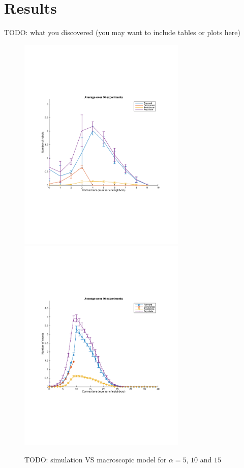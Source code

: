 \documentclass[a4paper, 10pt, conference]{ieeeconf}
\begin{document}
\section{Results}
  TODO: what you discovered (you may want to include tables or plots here)\\

  \begin{figure}[h]
    \begin{center}
      \includegraphics[width=8cm]{figures/simulation-10-alpha4.pdf}
      \includegraphics[width=8cm]{figures/simulation-40-alpha10.pdf}
      \caption{TODO: simulation VS macroscopic model for $\alpha = 5$, $10$ and $15$}
    \end{center}
  \end{figure}
\end{document}
